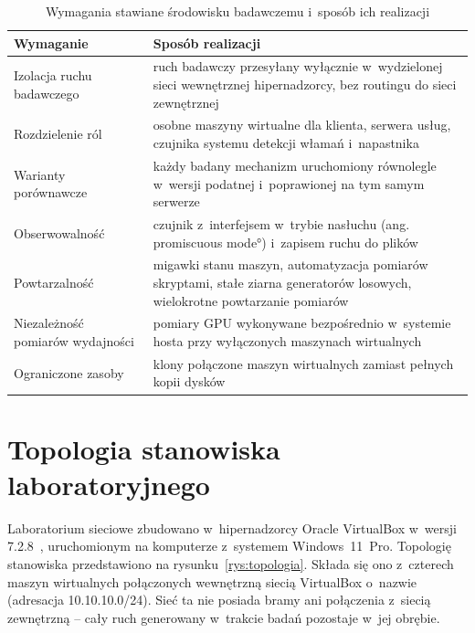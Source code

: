 \begin{table}[htbp]
\centering\small
\begin{tabularx}{\textwidth}{@{}>{\raggedright\arraybackslash}p{4.2cm}L@{}}
\toprule
\textbf{Wymaganie} & \textbf{Sposób realizacji} \\
\midrule
Izolacja ruchu badawczego & ruch badawczy przesyłany wyłącznie w~wydzielonej sieci wewnętrznej hipernadzorcy, bez routingu do sieci zewnętrznej \\
Rozdzielenie ról & osobne maszyny wirtualne dla klienta, serwera usług, czujnika systemu detekcji włamań i~napastnika \\
Warianty porównawcze & każdy badany mechanizm uruchomiony równolegle w~wersji podatnej i~poprawionej na tym samym serwerze \\
Obserwowalność & czujnik z~interfejsem w~trybie nasłuchu (ang. \ang{promiscuous mode}) i~zapisem ruchu do plików  \\
Powtarzalność & migawki stanu maszyn, automatyzacja pomiarów skryptami, stałe ziarna generatorów losowych, wielokrotne powtarzanie pomiarów \\
Niezależność pomiarów wydajności & pomiary GPU wykonywane bezpośrednio w~systemie hosta przy wyłączonych maszynach wirtualnych \\
Ograniczone zasoby & klony połączone maszyn wirtualnych zamiast pełnych kopii dysków \\
\bottomrule
\end{tabularx}
\caption{Wymagania stawiane środowisku badawczemu i~sposób ich realizacji}
\label{tab:wymagania}
\end{table}

\section{Topologia stanowiska laboratoryjnego}\label{sec:topologia}

Laboratorium sieciowe zbudowano w~hipernadzorcy Oracle VirtualBox w~wersji 7.2.8~\cite{virtualbox}, uruchomionym na komputerze z~systemem Windows~11~Pro. Topologię stanowiska przedstawiono na rysunku~\ref{rys:topologia}. Składa się ono z~czterech maszyn wirtualnych połączonych wewnętrzną siecią VirtualBox o~nazwie  (adresacja 10.10.10.0/24). Sieć ta nie posiada bramy ani połączenia z~siecią zewnętrzną -- cały ruch generowany w~trakcie badań pozostaje w~jej obrębie.

